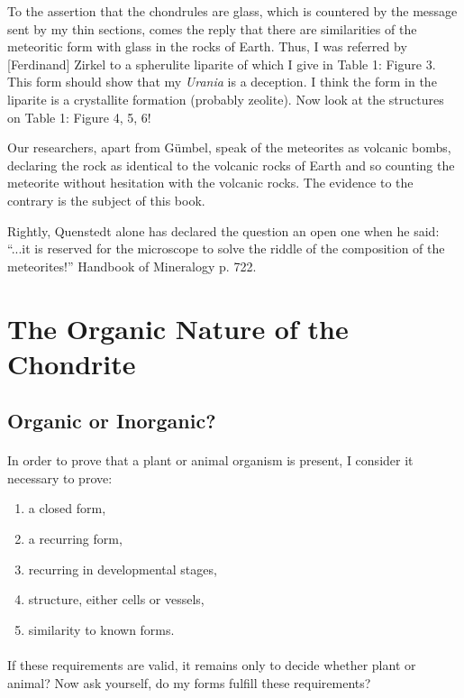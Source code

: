 \documentclass[a4paper, 12pt, oneside]{article}
\begin{document}
To the assertion that the chondrules are glass, which is countered by the message sent by my thin sections, comes the reply that there are similarities of the meteoritic form with glass in the rocks of Earth. Thus, I was referred by [Ferdinand] Zirkel to a spherulite liparite of which I give in Table 1: Figure 3. This form should show that my \emph{Urania} is a deception. I think the form in the liparite is a crystallite formation (probably zeolite). Now look at the structures on Table 1: Figure 4, 5, 6!

Our researchers, apart from Gümbel, speak of the meteorites as volcanic bombs, declaring the rock as identical to the volcanic rocks of Earth and so counting the meteorite without hesitation with the volcanic rocks. The evidence to the contrary is the subject of this book.

Rightly, Quenstedt alone has declared the question an open one when he said: ``...it is reserved for the microscope to solve the riddle of the composition of the meteorites!'' Handbook of Mineralogy p. 722.
\clearpage
\section{The Organic Nature of the Chondrite}
\subsection{Organic or Inorganic?}
\paragraph{}
In order to prove that a plant or animal organism is present, I consider it necessary to prove:
\begin{enumerate}
    \item a closed form,
    \item a recurring form,
    \item recurring in developmental stages,
    \item structure, either cells or vessels,
    \item similarity to known forms.
\end{enumerate}
\paragraph{}
If these requirements are valid, it remains only to decide whether plant or animal? Now ask yourself, do my forms fulfill these requirements?
\end{document}
